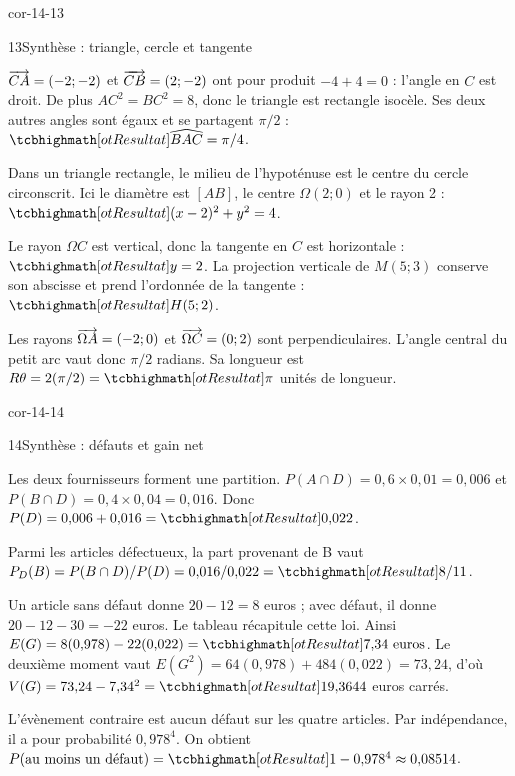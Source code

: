 \begin{blocLivre}{cor-14-13}
\begin{corrige}{13}{Synthèse : triangle, cercle et tangente}
\begin{questions}
\item $\overrightarrow{CA}=(-2;-2)$ et $\overrightarrow{CB}=(2;-2)$ ont pour produit $-4+4=0$ : l’angle en $C$ est droit.
De plus $AC^2=BC^2=8$, donc le triangle est rectangle isocèle.
Ses deux autres angles sont égaux et se partagent $\pi/2$ : $\res{\widehat{BAC}=\pi/4}$.
\item Dans un triangle rectangle, le milieu de l’hypoténuse est le centre du cercle circonscrit.
Ici le diamètre est $[AB]$, le centre $\Omega(2;0)$ et le rayon 2 :
$\res{(x-2)^2+y^2=4}$.
\item Le rayon $\Omega C$ est vertical, donc la tangente en $C$ est horizontale : $\res{y=2}$.
La projection verticale de $M(5;3)$ conserve son abscisse et prend l’ordonnée de la tangente : $\res{H(5;2)}$.
\item Les rayons $\overrightarrow{\Omega A}=(-2;0)$ et $\overrightarrow{\Omega C}=(0;2)$ sont perpendiculaires.
L’angle central du petit arc vaut donc $\pi/2$ radians.
Sa longueur est $R\theta=2(\pi/2)=\res{\pi}$ unités de longueur.
\end{questions}

\label{figlivre-r14-13-geometrie-cor}

\end{corrige}
\end{blocLivre}
\begin{blocLivre}{cor-14-14}
\begin{corrige}{14}{Synthèse : défauts et gain net}
\begin{questions}
\item Les deux fournisseurs forment une partition.
$P(A\cap D)=0{,}6\times0{,}01=0{,}006$ et $P(B\cap D)=0{,}4\times0{,}04=0{,}016$.
Donc $P(D)=0{,}006+0{,}016=\res{0{,}022}$.
\item Parmi les articles défectueux, la part provenant de B vaut
$P_D(B)=P(B\cap D)/P(D)=0{,}016/0{,}022=\res{8/11}$.
\item Un article sans défaut donne $20-12=8$ euros ; avec défaut, il donne $20-12-30=-22$ euros.
Le tableau récapitule cette loi.
Ainsi $E(G)=8(0{,}978)-22(0{,}022)=\res{7{,}34\text{ euros}}$.
Le deuxième moment vaut $E(G^2)=64(0{,}978)+484(0{,}022)=73{,}24$,
d’où $V(G)=73{,}24-7{,}34^2=\res{19{,}3644}$ euros carrés.
\item L’évènement contraire est aucun défaut sur les quatre articles.
Par indépendance, il a pour probabilité $0{,}978^4$.
On obtient $P(\text{au moins un défaut})=\res{1-0{,}978^4\approx0{,}08514}$.
\end{questions}

\label{figlivre-r14-14-cor}

\label{figlivre-r14-14-loi-cor}

\end{corrige}
\end{blocLivre}
